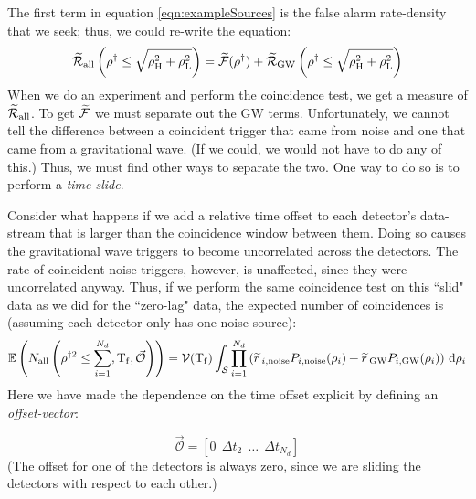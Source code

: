 The first term in equation \ref{eqn:exampleSources} is the false alarm rate-density that we seek; thus, we could re-write the equation:
\begin{equation}
\widetilde{\mathcal{R}}_{\mathrm{all}}\left(\rho^\dagger \leq \sqrt{\rho_{\mathrm{H}}^2 + \rho_{\mathrm{L}}^2} \right) = \widetilde{\mathcal{F}}(\rho^\dagger) + \widetilde{\mathcal{R}}_{\mathrm{GW}}\left(\rho^\dagger \leq \sqrt{\rho_{\mathrm{H}}^2 + \rho_{\mathrm{L}}^2} \right)
\end{equation}
When we do an experiment and perform the coincidence test, we get a measure of $\widetilde{\mathcal{R}}_{\mathrm{all}}$. To get $\widetilde{\mathcal{F}}$ we must separate out the \ac{GW} terms. Unfortunately, we cannot tell the difference between a coincident trigger that came from noise and one that came from a gravitational wave. (If we could, we would not have to do any of this.) Thus, we must find other ways to separate the two. One way to do so is to perform a \emph{time slide}.

Consider what happens if we add a relative time offset to each detector's data-stream that is larger than the coincidence window between them. Doing so causes the gravitational wave triggers to become uncorrelated across the detectors. The rate of coincident noise triggers, however, is unaffected, since they were uncorrelated anyway. Thus, if we perform the same coincidence test on this ``slid" data as we did for the ``zero-lag" data, the expected number of coincidences is (assuming each detector only has one noise source):
\begin{equation}
\label{eqn:exptd_slid_coincs}
\Exptd \left(N_{\mathrm{all}} \left( \rho^{\dagger2} \leq \sum_{i=1}^{N_d}, \Tf, \vec{\mathcal{O}} \right) \right) = \vT(\Tf) \int_{\mathcal{S}} \prod_{i=1}^{N_d} \left( \rsrc_{i,\mathrm{noise}} P_{i,\mathrm{noise}}(\rho_i) + \rsrc_{\mathrm{GW}} P_{i,\mathrm{GW}}(\rho_i) \right) \d \rho_i
\end{equation}
Here we have made the dependence on the time offset explicit by defining an \emph{offset-vector}:

\begin{equation}
\label{eqn:offset_vec}
\vec{\mathcal{O}} = \left[0 ~~ \Delta t_2 ~~ \ldots ~~ \Delta t_{N_d} \right]
\end{equation}
(The offset for one of the detectors is always zero, since we are sliding the detectors with respect to each other.)


